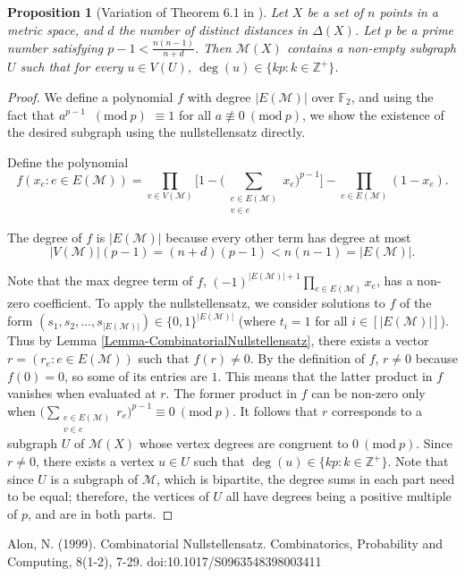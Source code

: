 \documentclass[12]{article}
\newcommand{\Z}{\mathbb{Z}}
\newcommand{\Mod}[1]{\ (\mathrm{mod}\ #1)}
\newtheorem{prop}[thm]{Proposition}
\theoremstyle{definition}
\begin{document}
	\begin{prop}[Variation of Theorem 6.1 in \cite{alon}]\label{Prop-SubgraphNullstellensatzResult}
		Let $X$ be a set of $n$ points in a metric space, and $d$ the number of distinct distances in $\Delta(X)$.  Let $p$ be a prime number satisfying $p-1 < \tfrac{n(n-1)}{n+d}$.  Then $\mathcal{M}(X)$ contains a non-empty subgraph $U$ such that for every $u \in V(U)$, $\deg(u) \in \{kp: k \in \Z^+\}$.  %
	\end{prop}
	\begin{proof}
		We define a polynomial $f$ with degree $|E(\mathcal{M})|$ over $\mathbb{F}_2$, and using the fact that $a^{p-1}$ $\Mod{p}$ $\equiv 1$ for all $a \not\equiv 0 \Mod{p}$, we show the existence of the desired subgraph using the nullstellensatz directly.
		
		Define the polynomial
		$$f(x_e:e \in E(\mathcal{M})) = \prod_{v \in V(\mathcal{M})} \biggr[1 - \Big(\sum_{\substack{e \in E(\mathcal{M})\\ v \in e}}x_e \Big)^{p-1} \biggr] - \prod_{e \in E(\mathcal{M})}(1-x_e).$$
		
		The degree of $f$ is $|E(\mathcal{M})|$ because every other term has degree at most
		$$|V(\mathcal{M})| (p-1) = (n+d)(p-1) < n(n-1) = |E(\mathcal{M})|.$$
		
		Note that the max degree term of $f$, $(-1)^{|E(\mathcal{M})|+1}\prod_{e \in E(\mathcal{M})} x_e$, has a non-zero coefficient. 
		To apply the nullstellensatz, we consider solutions to $f$ of the form $(s_1,s_2,\ldots,s_{|E(\mathcal{M})|}) \in \{0,1\}^{|E(\mathcal{M})|}$ (where $t_i = 1$ for all $i \in [|E(\mathcal{M})|]$).  Thus by Lemma \ref{Lemma-CombinatorialNullstellensatz}, there exists a vector $r=(r_e:e \in E(\mathcal{M}))$ such that $f(r) \neq 0$.  By the definition of $f$, $r \neq 0$ because $f(0) = 0$, so some of its entries are $1$.  This means that the latter product in $f$ vanishes when evaluated at $r$.  The former product in $f$ can be non-zero only when $\Big(\sum_{\substack{e \in E(\mathcal{M})\\ v \in e}}r_e \Big)^{p-1} \equiv 0 \Mod{p}$.  It follows that $r$ corresponds to a subgraph $U$ of $\mathcal{M}(X)$ whose vertex degrees are congruent to $0 \Mod{p}$.  Since $r \neq 0$, there exists a vertex $u \in U$ such that $\deg(u) \in \{kp: k \in \Z^+\}$.  Note that since $U$ is a subgraph of $\mathcal{M}$, which is bipartite, the degree sums in each part need to be equal; therefore, the vertices of $U$ all have degrees being a positive multiple of $p$, and are in both parts. \qedhere
	\end{proof}
	
	
	\newpage
	\begin{thebibliography}{100}
		 Alon, N. (1999). Combinatorial Nullstellensatz. Combinatorics, Probability and Computing, 8(1-2), 7-29. doi:10.1017/S0963548398003411
	\end{thebibliography}
	
\end{document}

